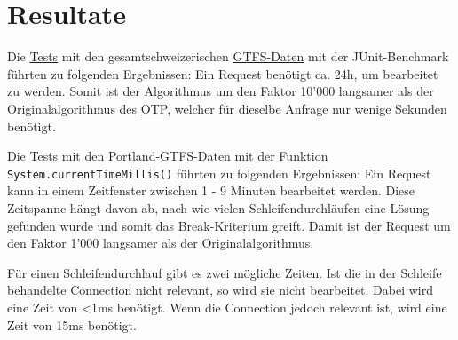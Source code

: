 \section{Resultate}
Die \hyperlink{performanceTest}{Tests} mit den gesamtschweizerischen \hyperlink{GTFS}{GTFS-Daten} mit der \gls{JUnit}-Benchmark führten zu folgenden Ergebnissen: Ein Request benötigt ca. 24h, um bearbeitet zu werden. Somit ist der Algorithmus um den Faktor 10'000 langsamer als der Originalalgorithmus des \hyperlink{OTP}{OTP}, welcher für dieselbe Anfrage nur wenige Sekunden benötigt. \newline

Die Tests mit den Portland-GTFS-Daten mit der Funktion \texttt{System.currentTimeMillis()} führten zu folgenden Ergebnissen: Ein Request kann in einem Zeitfenster zwischen 1 - 9 Minuten bearbeitet werden. Diese Zeitspanne hängt davon ab, nach wie vielen Schleifendurchläufen eine Lösung gefunden wurde und somit das Break-Kriterium greift. Damit ist der Request um den Faktor 1'000 langsamer als der Originalalgorithmus. \newline

Für einen Schleifendurchlauf gibt es zwei mögliche Zeiten. Ist die in der Schleife behandelte Connection nicht relevant, so wird sie nicht bearbeitet. Dabei wird eine Zeit von <1ms benötigt. Wenn die Connection jedoch relevant ist, wird eine Zeit von 15ms benötigt.
